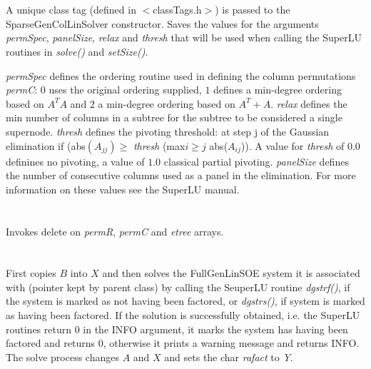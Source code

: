   \\
  \\
A unique class tag (defined in $<$classTags.h$>$) is passed to the
SparseGenColLinSolver constructor. Saves the values for the arguments
{\em permSpec}, {\em panelSize}, {\em relax} and {\em thresh} that
will be used when calling the SuperLU routines in {\em solve()} and
{\em setSize()}.

{\em permSpec} defines the ordering routine used in defining the
column permutations {\em permC}: $0$ uses the original ordering
supplied, $1$ defines a min-degree ordering based on $A^TA$ and $2$ a
min-degree ordering based on $A^T + A$. {\em relax} defines the min
number of columns in a subtree for the subtree to be considered a
single supernode. {\em thresh} defines the pivoting threshold: at
step j of the Gaussian elimination if (abs$(A_{jj}) \ge$ {\em thresh}
(max$ i \ge j$ abs($A_{ij}$)). A value for {\em thresh} of $0.0$
definines no pivoting, a value of $1.0$ classical partial pivoting.
{\em panelSize} defines the number of consecutive columns used as a
panel in the elimination. For more information on these values see the
SuperLU manual. \\


 \\
\\ 
Invokes delete on {\em permR}, {\em permC} and {\em etree} arrays. \\


  \\
 \\
First copies $B$ into $X$ and then solves the FullGenLinSOE system 
it is associated with (pointer kept by parent class) by calling the SeuperLU
routine {\em dgstrf()}, if the system is marked as not having been factored,
or {\em dgstrs()}, if system is marked as having been factored. If the
solution is successfully obtained, i.e. the SuperLU routines return $0$
in the INFO argument, it marks the system has having been
factored and returns $0$, otherwise it prints a warning message and
returns INFO. The solve process changes $A$ and $X$ and sets the char
{\em rafact} to {\em Y}. \\   


